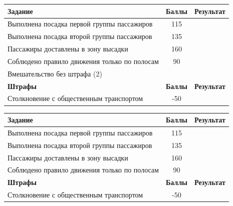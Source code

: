 \documentclass[12pt]{article}
\newcommand{\penaltyBusPoints}{\color{red}-50}
\newcommand{\boardingPassangersFirstZone}{115}
\newcommand{\boardingPassangersSecondZone}{135}
\newcommand{\passangersDelievery}{160}
\newcommand{\complianceTrafficRules}{90}
\begin{document}
\vspace*{0.25cm}
\begin{tabularx}{\textwidth}{|X|c|p{2cm}|}
    \hline
    \textbf{Задание} & \textbf{Баллы} & \textbf{Результат}\\
    \hline
    Выполнена посадка первой группы пассажиров & \boardingPassangersFirstZone &  \\
    \hline
    Выполнена посадка второй группы пассажиров & \boardingPassangersSecondZone & \\
    \hline
    Пассажиры доставлены в зону высадки & \passangersDelievery & \\
    \hline 
    Соблюдено правило движения только по полосам & \complianceTrafficRules & \\
    \hline
    Вмешательство без штрафа (2) &  & \\
    \hline
    \textbf{Штрафы} & \textbf{Баллы} & \textbf{Результат} \\
    \hline
    Столкновение с общественным транспортом & \penaltyBusPoints &  \\
    \hline
\end{tabularx}
\vspace*{0.25cm}

\vspace*{0.25cm}
\begin{tabularx}{\textwidth}{|X|c|p{2cm}|}
    \hline
    \textbf{Задание} & \textbf{Баллы} & \textbf{Результат}\\
    \hline
    Выполнена посадка первой группы пассажиров & \boardingPassangersFirstZone &  \\
    \hline
    Выполнена посадка второй группы пассажиров & \boardingPassangersSecondZone & \\
    \hline
    Пассажиры доставлены в зону высадки & \passangersDelievery & \\
    \hline 
    Соблюдено правило движения только по полосам & \complianceTrafficRules & \\
    \hline
    \textbf{Штрафы} & \textbf{Баллы} & \textbf{Результат} \\
    \hline
    Столкновение с общественным транспортом & \penaltyBusPoints &  \\
    \hline
\end{tabularx}
\vspace*{1cm}

\end{document}
